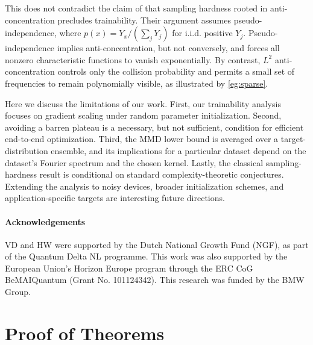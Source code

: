 \documentclass{article}
\theoremstyle{plain}
\theoremstyle{definition}
\theoremstyle{remark}
\begin{document}
This does not contradict the claim of \citet{herbst25} that sampling hardness rooted in anti-concentration precludes trainability. Their argument assumes pseudo-independence, where $p(x)=Y_x/(\sum_jY_j)$ for i.i.d. positive $Y_j$. Pseudo-independence implies anti-concentration, but not conversely, and forces all nonzero characteristic functions to vanish exponentially. By contrast, $L^2$ anti-concentration controls only the collision probability and permits a small set of frequencies to remain polynomially visible, as illustrated by \cref{eg:sparse}.

Here we discuss the limitations of our work. First, our trainability analysis focuses on gradient scaling under random parameter initialization. Second, avoiding a barren plateau is a necessary, but not sufficient, condition for efficient end-to-end optimization. Third, the MMD lower bound is averaged over a target-distribution ensemble, and its implications for a particular dataset depend on the dataset's Fourier spectrum and the chosen kernel. Lastly, the classical sampling-hardness result is conditional on standard complexity-theoretic conjectures. Extending the analysis to noisy devices, broader initialization schemes, and application-specific targets are interesting future directions.

\paragraph{Acknowledgements} VD and HW were supported by the Dutch National Growth Fund (NGF), as part of the Quantum Delta NL programme.
This work was also supported by the European Union’s Horizon Europe program through the ERC CoG BeMAIQuantum (Grant No. 101124342). This research was funded by the BMW Group. 


\newpage




\appendix

\onecolumn
\section{Proof of Theorems}
\end{document}
